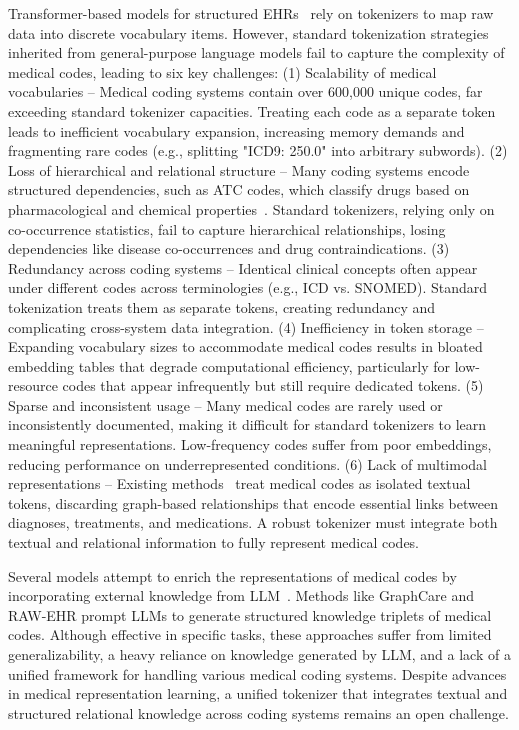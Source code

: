 Transformer-based models for structured EHRs~\cite{gtbehrt,transform_ehr,graphcare,ethos} rely on tokenizers to map raw data into discrete vocabulary items. However, standard tokenization strategies inherited from general-purpose language models fail to capture the complexity of medical codes, leading to six key challenges: (1) Scalability of medical vocabularies – Medical coding systems contain over 600,000 unique codes, far exceeding standard tokenizer capacities. Treating each code as a separate token leads to inefficient vocabulary expansion, increasing memory demands and fragmenting rare codes (e.g., splitting "ICD9: 250.0" into arbitrary subwords). (2) Loss of hierarchical and relational structure – Many coding systems encode structured dependencies, such as ATC codes, which classify drugs based on pharmacological and chemical properties~\cite{miller1995new}. Standard tokenizers, relying only on co-occurrence statistics, fail to capture hierarchical relationships, losing dependencies like disease co-occurrences and drug contraindications. (3) Redundancy across coding systems – Identical clinical concepts often appear under different codes across terminologies (e.g., ICD vs. SNOMED). Standard tokenization treats them as separate tokens, creating redundancy and complicating cross-system data integration. (4) Inefficiency in token storage – Expanding vocabulary sizes to accommodate medical codes results in bloated embedding tables that degrade computational efficiency, particularly for low-resource codes that appear infrequently but still require dedicated tokens. (5) Sparse and inconsistent usage – Many medical codes are rarely used or inconsistently documented, making it difficult for standard tokenizers to learn meaningful representations. Low-frequency codes suffer from poor embeddings, reducing performance on underrepresented conditions. (6) Lack of multimodal representations – Existing methods~\cite{graphcare,10.1145/3627673.3679582,xu-etal-2024-ram} treat medical codes as isolated textual tokens, discarding graph-based relationships that encode essential links between diagnoses, treatments, and medications. A robust tokenizer must integrate both textual and relational information to fully represent medical codes.

Several models attempt to enrich the representations of medical codes by incorporating external knowledge from LLM~\cite{graphcare,10.1145/3627673.3679582,xu-etal-2024-ram}. Methods like GraphCare and RAW-EHR prompt LLMs to generate structured knowledge triplets of medical codes. Although effective in specific tasks, these approaches suffer from limited generalizability, a heavy reliance on knowledge generated by LLM, and a lack of a unified framework for handling various medical coding systems. Despite advances in medical representation learning, a unified tokenizer that integrates textual and structured relational knowledge across coding systems remains an open challenge.

